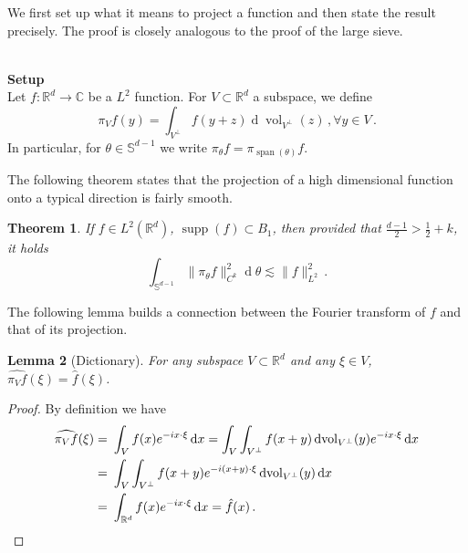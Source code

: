 \documentclass[12pt]{amsart}
\newtheorem{theorem}{Theorem}[section]
\newtheorem{lemma}[theorem]{Lemma}
\newcommand{\CC}{\mathbb{C}}
\newcommand{\RR}{\mathbb{R}}
\begin{document}
  We first set up what it means to project a function and then state the result precisely.   The proof is closely analogous to the proof of the large sieve.

\ \\
\textbf{Setup}\\
Let $f:\mathbb{R}^d\to \CC$ be a $L^2$ function. For $V\subset \RR^d$ a subspace, we define
\[
\pi_Vf(y)=\int_{V^\perp}f(y+z)\operatorname{d}\!\operatorname{vol}_{V^\perp}(z)\,,\forall y\in V\,.
\]
In particular, for $\theta\in \mathbb{S}^{d-1}$ we write $\pi_\theta f=\pi_{\operatorname{span}(\theta)}f$.

The following theorem states that the projection of a high dimensional function onto a typical direction is fairly smooth. 

\begin{theorem}\label{thm-smoothing-by-projecting-to-typical-direction}
    If $f\in L^2(\RR^d)$, $\operatorname{supp}(f)\subset B_1$, then provided that $\frac{d-1}{2}>\frac12+{k}$, it holds
    \[
    \int_{\mathbb{S}^{d-1}}\|\pi_\theta f\|_{{C}^k}^2\operatorname{d}\!\theta\lesssim \|f\|_{L^2}^2\,.
    \]
\end{theorem}

The following lemma builds a connection between the Fourier transform of $f$ and that of its projection.
\begin{lemma}[Dictionary]
    For any subspace $V\subset \RR^d$ and any $\xi\in V$, $\widehat{\pi_Vf}(\xi)=\hat{f}(\xi)$. 
\end{lemma}
\begin{proof}
    By definition we have
    \begin{align*}
    \widehat{\pi_Vf}(\xi)=&\ \int_Vf(x)e^{-ix\cdot \xi}\operatorname{d}\!x=\int_V\int_{V^\perp}f(x+y)\operatorname{d}\!\operatorname{vol}_{V^\perp}(y)e^{-ix\cdot \xi}\operatorname{d}\!x\\
    =&\ \int_V\int_{V^\perp}f(x+y)e^{-i(x+y)\cdot \xi}\operatorname{d}\!\operatorname{vol}_{V^\perp}(y)\operatorname{d}\!x\\
    =&\ \int_{\RR^d}f(x)e^{-ix\cdot \xi}\operatorname{d}\!x=\hat{f}(x)\,.\qedhere
    \end{align*}
\end{proof}
\end{document}
